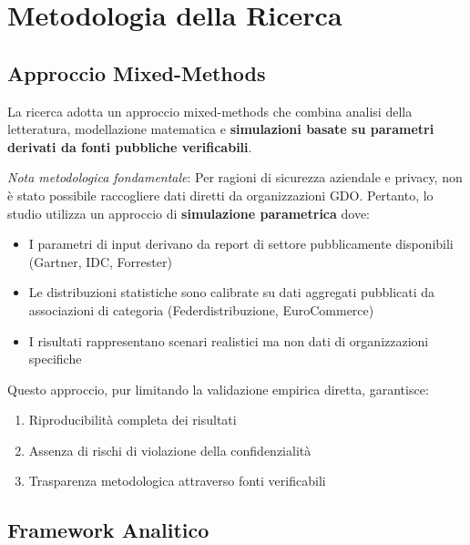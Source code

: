 \documentclass[12pt,a4paper,oneside]{book}
\providecommand{\tightlist}{%
  \setlength{\itemsep}{0pt}\setlength{\parskip}{0pt}
}
\numberwithin{figure}{chapter} %
\numberwithin{table}{chapter}  %
\begin{document}
\section{\texorpdfstring{\textbf{Metodologia della
Ricerca}}{1.5 Metodologia della Ricerca}}\label{metodologia-della-ricerca}

\subsection{\texorpdfstring{\textbf{Approccio
Mixed-Methods}}{1.5.1 Approccio Mixed-Methods}}\label{approccio-mixed-methods}

La ricerca adotta un approccio mixed-methods che combina analisi della letteratura, modellazione matematica e \textbf{simulazioni basate su parametri derivati da fonti pubbliche verificabili}.

\emph{Nota metodologica fondamentale}: Per ragioni di sicurezza
aziendale e privacy, non è stato possibile raccogliere dati diretti da organizzazioni GDO. Pertanto, lo studio utilizza un approccio di \textbf{simulazione parametrica} dove:

\begin{itemize}
\tightlist
\item
  I parametri di input derivano da report di settore pubblicamente
  disponibili (Gartner, IDC, Forrester)\\
\item
  Le distribuzioni statistiche sono calibrate su dati aggregati
  pubblicati da associazioni di categoria (Federdistribuzione,
  EuroCommerce)\\
\item
  I risultati rappresentano scenari realistici ma non dati di
  organizzazioni specifiche
\end{itemize}

Questo approccio, pur limitando la validazione empirica diretta,
garantisce:

\begin{enumerate}
\def\labelenumi{\arabic{enumi}.}
\tightlist
\item
  Riproducibilità completa dei risultati\\
\item
  Assenza di rischi di violazione della confidenzialità\\
\item
  Trasparenza metodologica attraverso fonti verificabili
\end{enumerate}

\subsection{\texorpdfstring{\textbf{Framework
Analitico}}{1.5.2 Framework Analitico}}\label{framework-analitico}
\end{document}
